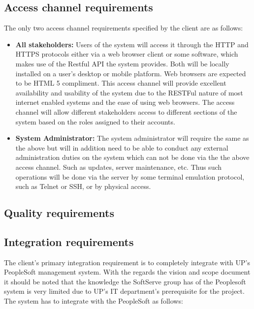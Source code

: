\documentclass[12pt]{article}
\begin{document}
\subsection{Access channel requirements}
\vspace{0.2in}
The only two access channel requirements specified by the client are as follows:
\begin{itemize}

\item \textbf{All stakeholders:}
Users of the system will access it through the HTTP and HTTPS protocols either via a web browser client or some software, which makes use of the Restful API the system provides. Both will be locally installed on a user's desktop or mobile platform. Web browsers are expected to be HTML 5 compliment. This access channel will provide excellent availability and usability of the system due to the RESTFul nature of most internet enabled systems and the ease of using web browsers. The access channel will allow different stakeholders access to different sections of the system based on the roles assigned to their accounts. 

\item\textbf{System Administrator:}
The system administrator will require the same as the above but will in addition need to be able to conduct any external administration duties on the system which can not be done via the the above access channel. Such as updates, server maintenance, etc. Thus such operations will be done via the server by some terminal emulation protocol, such as Telnet or SSH, or by physical access. 

\end{itemize}
\vspace{0.2in}

\subsection{Quality requirements}
\vspace{0.2in}



\vspace{0.1in}

\newpage
\subsection{Integration requirements}
\vspace{0.2in}
The client's primary integration requirement is to completely integrate with UP's PeopleSoft management system. With the regards the vision and scope document it should be noted that the knowledge the SoftServe group has of the Peoplesoft system is very limited due to UP's IT department's prerequisite for the project. The system has to integrate with the PeopleSoft as follows:
\end{document}
